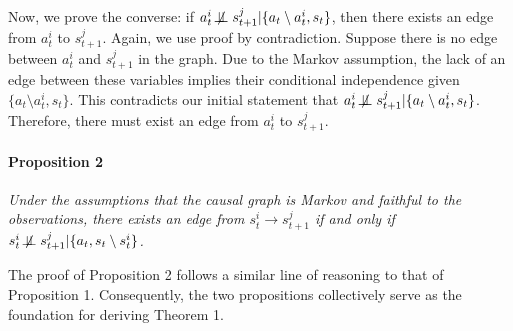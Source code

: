 Now, we prove the converse: if $a^i_t \not \! \perp \!\!\! \perp s^j_{t+1} | \{ a_t \setminus a^i_t, s_t \} $, then there exists an edge from $a^i_t$ to $s^{j}_{t+1}$. Again, we use proof by contradiction. Suppose there is no edge between $a^i_t$ and $s^{j}_{t+1}$ in the graph. Due to the Markov assumption, the lack of an edge between these variables implies their conditional independence given $\{ a_t \setminus a^i_t, s_t \}$. This contradicts our initial statement that $a^i_t \not \! \perp \!\!\! \perp  s^j_{t+1} | \{ a_t \setminus a^i_t, s_t \}$. Therefore, there must exist an edge from $a^i_t$ to $s^{j}_{t+1}$.


\paragraph{Proposition 2} 
\textit{Under the assumptions that the causal graph is Markov and faithful to the observations, there exists an edge from $s^i_t \to s^j_{t+1}$ if and only if $s^i_t \not \! \perp \!\!\! \perp s^j_{t+1} | \{a_t, s_t  \setminus s^i_t\}$.}

The proof of Proposition 2 follows a similar line of reasoning to that of Proposition 1. Consequently, the two propositions collectively serve as the foundation for deriving Theorem 1.


